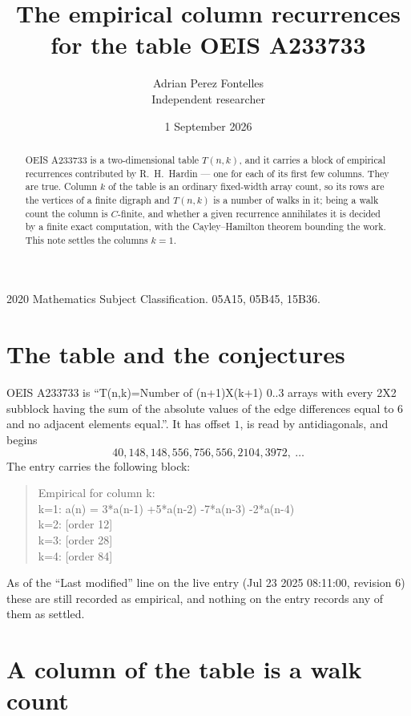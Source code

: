 \documentclass[11pt,a4paper]{article}
\title{The empirical column recurrences for the table OEIS A233733}
\author{Adrian Perez Fontelles\\ \small Independent researcher}
\date{1 September 2026}
\theoremstyle{plain}
\theoremstyle{definition}
\begin{document}
\maketitle

\begin{abstract}
OEIS A233733 is a two-dimensional table $T(n,k)$, and it carries a block of empirical
recurrences contributed by R.~H.~Hardin --- one for each of its first few columns. They are
true. Column $k$ of the table is an ordinary fixed-width array count, so its rows are the
vertices of a finite digraph and $T(n,k)$ is a number of walks in it; being a walk count the
column is $C$-finite, and whether a given recurrence annihilates it is decided by a finite
exact computation, with the Cayley--Hamilton theorem bounding the work. This note settles the
columns $k=1$.
\end{abstract}

\noindent\small 2020 Mathematics Subject Classification. 05A15, 05B45, 15B36.\normalsize

\section{The table and the conjectures}

OEIS A233733 is ``T(n,k)=Number of (n+1)X(k+1) 0..3 arrays with every 2X2 subblock having the sum of the absolute values of the edge differences equal to 6 and no adjacent elements equal.''. It has offset $1$, is
read by antidiagonals, and begins
\[
40, 148, 148, 556, 756, 556, 2104, 3972,\ \dots
\]
The entry carries the following block:
\begin{quote}\small
Empirical for column k:\\
k=1: a(n) = 3*a(n-1) +5*a(n-2) -7*a(n-3) -2*a(n-4)\\
k=2: [order 12]\\
k=3: [order 28]\\
k=4: [order 84]\\
\end{quote}
As of the ``Last modified'' line on the live entry (Jul 23 2025 08:11:00, revision 6) these are still
recorded as empirical, and nothing on the entry records any of them as settled.

\section{A column of the table is a walk count}
\end{document}
